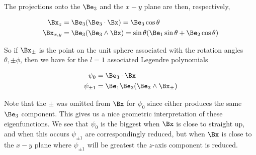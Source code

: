 The projections onto the $\Be_3$ and the $x-y$ plane are then, respectively,

\begin{align}\label{eqn:foob5}
\Bx_z &= \Be_3 (\Be_3 \cdot \Bx) = \Be_3 \cos\theta  \\
\Bx_{x,y} &= \Be_3 (\Be_3 \wedge \Bx) = \sin\theta (\Be_1 \sin\theta + \Be_2 \cos\theta) 
\end{align}

So if $\Bx_{\pm}$ is the point on the unit sphere associated with the rotation angles $\theta,\pm\phi$, then we have for the $l=1$ associated Legendre polynomials

\begin{align}\label{eqn:foob6}
\psi_0 &= \Be_3 \cdot \Bx \\
\psi_{\pm 1} &= \Be_1 \Be_3 (\Be_3 \wedge \Bx_{\pm})
\end{align}

Note that the $\pm$ was omitted from $\Bx$ for $\psi_0$ since either produces the same $\Be_3$ component.  This gives us a nice geometric interpretation of these eigenfunctions.  We see that $\psi_0$ is the biggest when $\Bx$ is close to straight up, and when this occurs $\psi_{\pm 1}$ are correspondingly reduced, but when $\Bx$ is close to the $x-y$ plane where $\psi_{\pm 1}$ will be greatest the $z$-axis component is reduced.

\EndArticle

